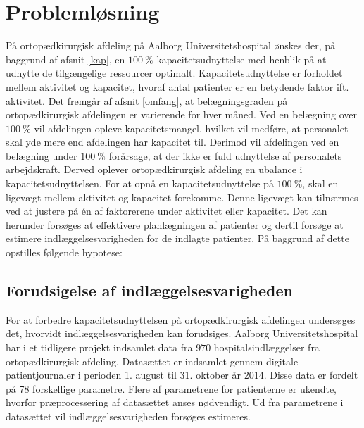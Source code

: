 \chapter{Problemløsning}
På ortopædkirurgisk afdeling på Aalborg Universitetshospital ønskes der, på baggrund af afsnit \ref{kap}, en $100~\%$ kapacitetsudnyttelse med henblik på at udnytte de tilgængelige ressourcer optimalt. Kapacitetsudnyttelse er forholdet mellem aktivitet og kapacitet, hvoraf antal patienter er en betydende faktor ift. aktivitet. 
Det fremgår af afsnit \ref{omfang}, at belægningsgraden på ortopædkirurgisk afdelingen er varierende for hver måned. Ved en belægning over $100~\%$ vil afdelingen opleve kapacitetsmangel, hvilket vil medføre, at personalet skal yde mere end afdelingen har kapacitet til. Derimod vil afdelingen ved en belægning under $100~\%$ forårsage, at der ikke er fuld udnyttelse af personalets arbejdskraft. Derved oplever ortopædkirurgisk afdeling en ubalance i kapacitetsudnyttelsen. 
For at opnå en kapacitetsudnyttelse på $100~\%$, skal en ligevægt mellem aktivitet og kapacitet forekomme. Denne ligevægt kan tilnærmes ved at justere på én af faktorerene under aktivitet eller kapacitet\cite{Bames2015}. Det kan herunder forsøges at effektivere planlægningen af patienter og dertil forsøge at estimere indlæggelsesvarigheden for de indlagte patienter. 
På baggrund af dette opstilles følgende hypotese:\\

\noindent
{} 

\section{Forudsigelse af indlæggelsesvarigheden}
For at forbedre kapacitetsudnyttelsen på ortopædkirurgisk afdelingen undersøges det, hvorvidt indlæggelsesvarigheden kan forudsiges.
Aalborg Universitetshospital har i et tidligere projekt indsamlet data fra $970$ hospitalsindlæggelser fra ortopædkirurgisk afdeling. Datasættet er indsamlet gennem digitale patientjournaler i perioden 1. august til 31. oktober år 2014. Disse data er fordelt på 78 forskellige parametre. Flere af parametrene for patienterne er ukendte, hvorfor præprocessering af datasættet anses nødvendigt. Ud fra parametrene i datasættet vil indlæggelsesvarigheden forsøges estimeres. 


